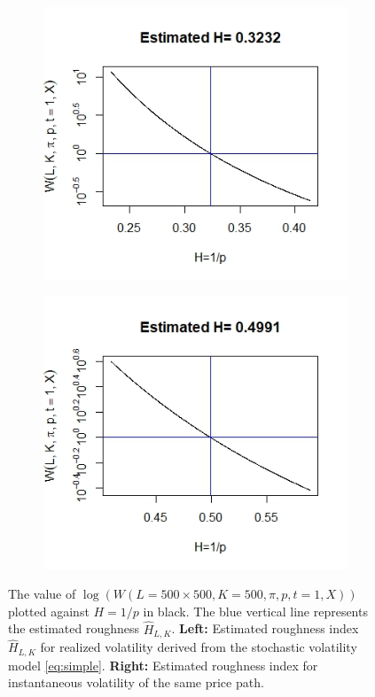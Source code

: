 \documentclass{article}
\begin{document}
\begin{figure}[htbp]
    \centering
    
    \begin{subfigure}{0.48\textwidth}
        \includegraphics[width=\linewidth]{ex5_RVw.jpeg}
    \end{subfigure}
    \hfill
    \begin{subfigure}{0.48\textwidth}
        \includegraphics[width=\linewidth]{ex5_IVw.jpeg}
    \end{subfigure}
    
    \caption{The value of $\log(W(L=500\times 500, K=500, \pi, p, t=1, X))$ plotted against $H=1/p$ in black. The blue vertical line represents the estimated roughness $\hat{H}_{L,K}$. \textbf{Left:} Estimated roughness index $\hat{H}_{L,K}$ for realized volatility derived from the stochastic volatility model \eqref{eq:simple}. \textbf{Right:} Estimated roughness index for instantaneous volatility of the same price path.}
    \label{fig:ex5w}
\end{figure}\\\\
\end{document}
